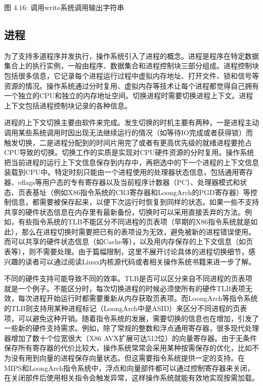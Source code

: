 \documentclass[]{ctexbook}
\begin{document}
图 4.16: 调用write系统调用输出字符串

\hypertarget{ux8fdbux7a0b}{%
\subsection{进程}\label{ux8fdbux7a0b}}

为了支持多道程序并发执行，操作系统引入了进程的概念。进程是程序在特定数据集合上的执行实例，一般由程序、数据集合和进程控制块三部分组成。进程控制块包括很多信息，它记录每个进程运行过程中虚拟内存地址、打开文件、锁和信号等资源的情况。操作系统通过分时复用、虚拟内存等技术让每个进程都觉得自己拥有一个独立的CPU和独立的内存地址空间。切换进程时需要切换进程上下文。进程上下文包括进程控制块记录的各种信息。

进程的上下文切换主要由软件来完成。发生切换的时机主要有两种，一是进程主动调用某些系统调用时因出现无法继续运行的情况（如等待IO完成或者获得锁）而触发切换，二是进程分配到的时间片用完了或者有更高优先级的就绪进程要抢占CPU导致的切换。切换工作的实质是实现对CPU硬件资源的分时复用。操作系统把当前进程的运行上下文信息保存到内存中，再把选中的下一个进程的上下文信息装载到CPU中。特定时刻只能由一个进程使用的处理器状态信息，包括通用寄存器、eflags等用户态的专有寄存器以及当前程序计数器（PC）、处理器模式和状态、页表基址（例如X86指令系统的CR3寄存器和LoongArch的PGD寄存器）等控制信息，都需要被保存起来，以便下次运行时恢复到同样的状态。如果一些不支持共享的硬件状态信息在内存里有最新备份，切换时可以采用直接丢弃的方法。例如，有些指令系统的TLB不能区分不同进程的页表项（早期的X86指令系统就是如此），那么在进程切换时需要把已有的表项设为无效，避免被新的进程错误使用。而可以共享的硬件状态信息（如Cache等），以及用内存保存的上下文信息（如页表等），则不需要处理。由于篇幅限制，这里不展开讨论具体的进程切换细节，感兴趣的读者可以通过阅读Linux内核源代码或者相关操作系统书籍来进一步了解。

不同的硬件支持可能导致不同的效率。TLB是否可以区分来自不同进程的页表项就是一个例子。不能区分时，每次切换进程的时候必须使所有的硬件TLB表项无效，每次进程开始运行时都需要重新从内存获取页表项。而LoongArch等指令系统的TLB则支持用某种进程标记（LoongArch中是ASID）来区分不同进程的页表项，可以避免这种开销。随着指令系统的发展，需要切换的信息也在增加，引发了一些新的硬件支持需求。例如，除了常规的整数和浮点通用寄存器，很多现代处理器增加了数十个位宽很大（X86 AVX扩展可达512位）的向量寄存器。由于无条件保存所有寄存器的代价比较大，操作系统常常会采用某种按需保存的优化，比如不为没有用到向量的进程保存向量状态。但这需要指令系统提供一定的支持。在MIPS和LoongArch指令系统中，浮点和向量部件都可以通过控制寄存器来关闭，在关闭部件后使用相关指令会触发异常，这样操作系统就能有效地实现按需加载。
\end{document}

